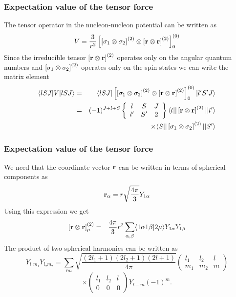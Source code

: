 \documentclass[compress]{beamer}
\newcommand*{\ket}[1]{|#1\rangle}
\newcommand*{\bra}[1]{\langle#1|}
\begin{document}
\frame
{
\frametitle{Expectation value of the tensor force}
\begin{small}
{\scriptsize
The tensor operator in 
the nucleon-nucleon potential can be written as  
\[
V=\frac{3}{r^{2}}\left[ \left[ {\bf \sigma}_1 \otimes {\bf \sigma}_2\right]^
{(2)} \otimes\left[{\bf r} \otimes {\bf r} \right]^{(2)}\right]^{(0)}_0
\]
Since the irreducible tensor  
$\left[{\bf r} \otimes {\bf r} \right]^{(2)}$
operates  only on the angular quantum numbers and
$\left[{\bf \sigma}_1 \otimes {\bf \sigma}_2\right]^{(2)}$ 
operates  only on 
the spin states we can write the matrix element 
\begin{eqnarray*}
\bra{lSJ}V\ket{lSJ}& = &
\bra{lSJ}\left[ \left[{\bf \sigma}_1 \otimes {\bf \sigma}_2\right]^{(2)} \otimes
\left[{\bf r} \otimes {\bf r} \right]^{(2)}\right]^{(0)}_0\ket{l'S'J}\\
&  = &
(-1)^{J+l+S}
\left\{\begin{array}{ccc} l&S&J \\ l'&S'&2\end{array}\right\}
\bra{l} |\left[{\bf r} \otimes {\bf r} \right]^{(2)} | \ket{l'}\\
& &
\times \bra{S} |\left[{\bf \sigma}_1 \otimes {\bf \sigma}_2\right]^{(2)} | \ket{S'}
\end{eqnarray*}
}
\end{small}
}

\frame
{
\frametitle{Expectation value of the tensor force}
\begin{small}
{\scriptsize
We need that
the coordinate vector ${\bf r}$ can be written in terms of spherical 
components as 
\[
{\bf r}_\alpha = r\sqrt{\frac{4\pi}{3}} Y_{1\alpha}
\]
Using this expression we get 
\begin{eqnarray*}
\left[{\bf r} \otimes {\bf r} \right]^{(2)}_\mu &=& \frac{4\pi}{3}r^2
\sum_{\alpha ,\beta}\bra{1\alpha 1\beta}2\mu \rangle Y_{1\alpha} Y_{1\beta}
\end{eqnarray*}
The product of two spherical harmonics can be written
as
\[
Y_{l_1m_1} Y_{l_2m_2}=\sum_{lm}\sqrt{\frac{(2l_1+1)(2l_2+1)(2l+1)}{4\pi}}
\left(\begin{array}{ccc} l_1&l_2&l \\ m_1&m_2&m\end{array}\right)
\]
\[
\times \left(\begin{array}{ccc} l_1&l_2&l \\ 0  &0  &0\end{array}\right)
Y_{l-m}(-1)^m.
\]
}
\end{small}
}
\end{document}
